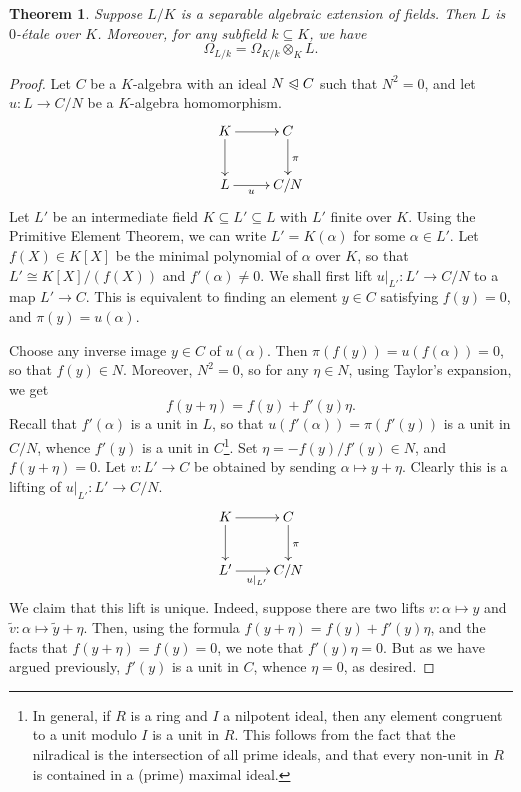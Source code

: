 \documentclass[10pt]{article}
\theoremstyle{thmstyle}
\newtheorem{theorem}{Theorem}[section]
\theoremstyle{defstyle}
\newcommand{\wt}[1]{\widetilde{#1}}
\newcommand{\noreq}{\trianglelefteqslant}
\begin{document}
\begin{theorem}
    Suppose $L/K$ is a separable algebraic extension of fields. Then $L$ is $0$-\'etale over $K$. Moreover, for any subfield $k\subseteq K$, we have 
    \begin{equation*}
        \Omega_{L/k} = \Omega_{K/k}\otimes_K L.
    \end{equation*}
\end{theorem}
\begin{proof}
    Let $C$ be a $K$-algebra with an ideal $N\noreq C$ such that $N^2 = 0$, and let $u\colon L\to C/N$ be a $K$-algebra homomorphism. 
    \begin{equation*}
        \xymatrix {
            K\ar[r]\ar[d] & C\ar[d]^\pi\\
            L\ar[r]_-u & C/N
        }
    \end{equation*}
    Let $L'$ be an intermediate field $K\subseteq L'\subseteq L$ with $L'$ finite over $K$. Using the Primitive Element Theorem, we can write $L' = K(\alpha)$ for some $\alpha\in L'$. Let $f(X)\in K[X]$ be the minimal polynomial of $\alpha$ over $K$, so that $L'\cong K[X]/(f(X))$ and $f'(\alpha)\ne 0$. We shall first lift $u|_{L'}\colon L'\to C/N$ to a map $L'\to C$. This is equivalent to finding an element $y\in C$ satisfying $f(y) = 0$, and $\pi(y) = u(\alpha)$.

    Choose any inverse image $y\in C$ of $u(\alpha)$. Then $\pi(f(y)) = u(f(\alpha)) = 0$, so that $f(y) \in N$. Moreover, $N^2 = 0$, so for any $\eta\in N$, using Taylor's expansion, we get 
    \begin{equation*}
        f(y + \eta) = f(y) + f'(y)\eta.
    \end{equation*}
    Recall that $f'(\alpha)$ is a unit in $L$, so that $u(f'(\alpha)) = \pi(f'(y))$ is a unit in $C/N$, whence $f'(y)$ is a unit in $C$\footnote{In general, if $R$ is a ring and $I$ a nilpotent ideal, then any element congruent to a unit modulo $I$ is a unit in $R$. This follows from the fact that the nilradical is the intersection of all prime ideals, and that every non-unit in $R$ is contained in a (prime) maximal ideal.}. Set $\eta = -f(y)/f'(y)\in N$, and $f(y + \eta) = 0$. Let $v\colon L'\to C$ be obtained by sending $\alpha\mapsto y + \eta$. Clearly this is a lifting of $u|_{L'}\colon L'\to C/N$.
    \begin{equation*}
        \xymatrix {
            K\ar[r]\ar[d] & C\ar[d]^\pi\\
            L'\ar[r]_{u|_{L'}} & C/N
        }
    \end{equation*}
    We claim that this lift is unique. Indeed, suppose there are two lifts $v\colon \alpha\mapsto y$ and $\wt v\colon\alpha\mapsto\wt y + \eta$. Then, using the formula $f(y + \eta) = f(y) + f'(y)\eta$, and the facts that $f(y + \eta) = f(y) = 0$, we note that $f'(y)\eta = 0$. But as we have argued previously, $f'(y)$ is a unit in $C$, whence $\eta = 0$, as desired.


\end{proof}
\end{document}
